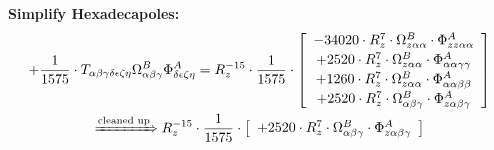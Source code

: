 \documentclass{article}
\begin{document}
\textbf{Simplify Hexadecapoles:}
\begin{subequations}\begin{gather}
+ \frac{1}{1575} \cdot T_{\alpha{}\beta{}\gamma{}\delta{}\epsilon{}\zeta{}\eta{}} \Omega{}^{B}_{\alpha{}\beta{}\gamma{}} \Phi{}^{A}_{\delta{}\epsilon{}\zeta{}\eta{}} = R_{z}^{-15} \cdot \frac{1}{1575} \cdot  \left[ \begin{array}{c} 
 		- 34020 \cdot R_{z}^{7} \cdot \Omega{}^{B}_{z\alpha{}\alpha{}} \cdot \Phi{}^{A}_{zz\alpha{}\alpha{}} 
 \\[0.2em] 		 + 2520 \cdot R_{z}^{7} \cdot \Omega{}^{B}_{z\alpha{}\alpha{}} \cdot \Phi{}^{A}_{\alpha{}\alpha{}\gamma{}\gamma{}} 
 \\[0.2em] 		 + 1260 \cdot R_{z}^{7} \cdot \Omega{}^{B}_{z\alpha{}\alpha{}} \cdot \Phi{}^{A}_{\alpha{}\alpha{}\beta{}\beta{}} 
 \\[0.2em] 		 + 2520 \cdot R_{z}^{7} \cdot \Omega{}^{B}_{\alpha{}\beta{}\gamma{}} \cdot \Phi{}^{A}_{z\alpha{}\beta{}\gamma{}}
 \end{array}\right] 
\\ \xRightarrow{\text{cleaned up}}
 R_{z}^{-15} \cdot \frac{1}{1575} \cdot  \left[ \begin{array}{c} 
 		+ 2520 \cdot R_{z}^{7} \cdot \Omega{}^{B}_{\alpha{}\beta{}\gamma{}} \cdot \Phi{}^{A}_{z\alpha{}\beta{}\gamma{}}
 \end{array}\right] 
\end{gather}\end{subequations}
\end{document}
